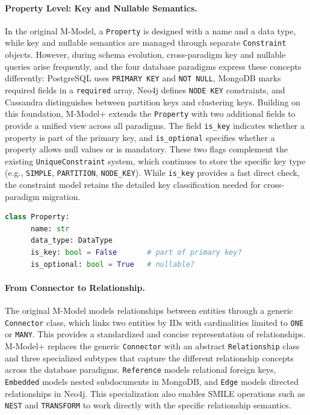 \paragraph{Property Level: Key and Nullable Semantics.}
 In the original M-Model, a \texttt{Property} is designed with a name and a data type, while key and nullable semantics are managed through separate \texttt{Constraint} objects. However, during schema evolution, cross-paradigm key and nullable queries arise frequently, and the four database paradigms express these concepts differently:
  PostgreSQL uses \texttt{PRIMARY KEY} and \texttt{NOT NULL}, MongoDB marks required fields in a \texttt{required} array, Neo4j defines \texttt{NODE
   KEY} constraints, and Cassandra distinguishes between partition keys and clustering keys.
  Building on this foundation, M-Model+ extends the \texttt{Property} with two additional fields to provide a unified view across all paradigms. The field \texttt{is\_key} indicates whether a property is part of the primary key, and \texttt{is\_optional} specifies whether a property allows null values or is mandatory. These two flags complement the existing \texttt{UniqueConstraint} system, which continues to store the specific key type (e.g., \texttt{SIMPLE}, \texttt{PARTITION}, \texttt{NODE\_KEY}).
  While \texttt{is\_key} provides a fast direct check, the constraint model retains the detailed key classification needed for cross-paradigm migration.
  \begin{lstlisting}[language=Python, basicstyle=\small\ttfamily]
  class Property:
      name: str
      data_type: DataType
      is_key: bool = False       # part of primary key?
      is_optional: bool = True   # nullable?
  \end{lstlisting}

 \paragraph{From Connector to Relationship.}
 The original M-Model models relationships between entities through a generic \texttt{Connector} class, which links two entities by IDs with
  cardinalities limited to \texttt{ONE} or \texttt{MANY}. This provides a standardized and concise representation of relationships. M-Model+ replaces the generic \texttt{Connector} with an abstract \texttt{Relationship} class and three specialized subtypes that capture the different
  relationship concepts across the database paradigms. \texttt{Reference} models relational foreign keys, \texttt{Embedded} models nested
  subdocuments in MongoDB, and \texttt{Edge} models directed relationships in Neo4j. This specialization also enables SMILE  operations such as
  \texttt{NEST} and \texttt{TRANSFORM} to work directly with the specific relationship semantics.


